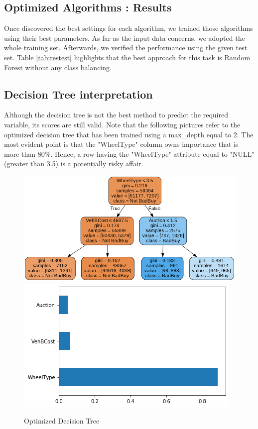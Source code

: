 \documentclass{article}
\begin{document}
	
	\subsection{Optimized Algorithms : Results}
	Once discovered the best settings for each algorithm, we trained those algorithms using their best parameters. As far as the input data concerns, we adopted the whole training set. Afterwards, we verified the performance using the given test set. Table \ref{tab:restest} highlights that the best approach for this task is Random Forest without any class balancing. 
	
	\subsection{Decision Tree interpretation}
	Although the decision tree is not the best method to predict the required variable, its scores are still valid. Note that the following pictures refer to the optimized decision tree that has been trained using a max\_depth equal to 2. The most evident point is that the "WheelType" column owns importance that is more than 80\%. Hence, a row having the "WheelType" attribute equal to "NULL" (greater than 3.5) is a potentially risky affair.
	
	\begin{figure}[H]
		\centering
		\includegraphics[width=.55\textwidth]{dectree.png}\hfill
		\includegraphics[width=.45\textwidth]{dectreevar.png}\hfill
		\caption{Optimized Decision Tree}
		\label{fig:optdectree}
	\end{figure}
	
	
	
\end{document}
